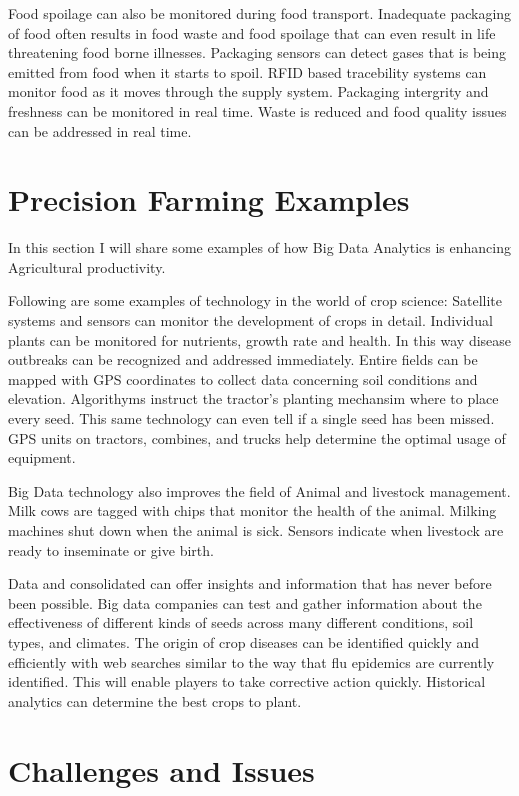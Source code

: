 \documentclass[sigconf]{acmart}
\begin{document}
Food spoilage can also be monitored during food transport. Inadequate packaging of food often results in food waste and food spoilage that can even result in life threatening food borne illnesses. Packaging sensors can detect gases that is being emitted from food when it starts to spoil. RFID based tracebility systems can monitor food as it moves through the supply system. Packaging intergrity and freshness can be monitored in real time. Waste is reduced and food quality issues can be addressed in real time. \cite{www-google1} 

\section {Precision Farming Examples}

In this section I will share some examples of how Big Data Analytics is enhancing Agricultural productivity.

Following are some examples of technology in the world of crop science: Satellite systems and sensors can monitor the development of crops in detail. Individual plants can be monitored for nutrients, growth rate and health. In this way disease outbreaks can be recognized and addressed immediately.  Entire fields can be mapped with GPS coordinates to collect data concerning soil conditions and elevation. Algorithyms instruct the tractor's planting mechansim where to place every seed. This same technology can even tell if a single seed has been missed. GPS units on tractors, combines, and trucks help determine the optimal usage of equipment.

Big Data technology also improves the field of Animal and livestock management. Milk cows are tagged with chips that monitor the health of the animal. Milking machines shut down when the animal is sick. Sensors indicate when livestock are ready to inseminate or give birth. 

Data and consolidated can offer insights and information that has never before been possible. Big data companies can test and gather information about the effectiveness of different kinds of seeds across many different conditions, soil types, and climates. The origin of crop diseases can be identified quickly and efficiently with web searches similar to the way that flu epidemics are currently identified. This will enable players to take corrective action quickly. Historical analytics can determine the best crops to plant. 


\section{Challenges and Issues}
\end{document}

